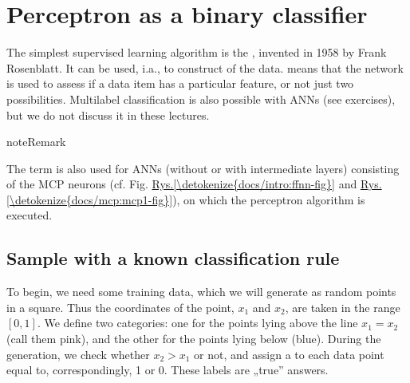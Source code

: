 \documentclass[a4paper,12pt,polish]{jupyterBook}
\begin{document}
\section{Perceptron as a binary classifier}
\label{\detokenize{docs/perceptron:perceptron-as-a-binary-classifier}}
\sphinxAtStartPar
The simplest supervised learning algorithm
is the , invented in 1958 by Frank Rosenblatt. It can be used, i.a., to
construct  of the data.  means that the network
is used to assess if a data item has a particular feature, or not \sphinxhyphen{} just two possibilities. Multi\sphinxhyphen{}label classification is also possible with ANNs (see exercises), but we do not discuss it in these lectures.

\begin{sphinxadmonition}{note}{Remark}

\sphinxAtStartPar
The term  is also used for ANNs (without or with intermediate layers) consisting of the MCP neurons (cf. Fig. \hyperref[\detokenize{docs/intro:ffnn-fig}]{Rys.\@ \ref{\detokenize{docs/intro:ffnn-fig}}} and \hyperref[\detokenize{docs/mcp:mcp1-fig}]{Rys.\@ \ref{\detokenize{docs/mcp:mcp1-fig}}}), on which the perceptron algorithm is executed.
\end{sphinxadmonition}


\subsection{Sample with a known classification rule}
\label{\detokenize{docs/perceptron:sample-with-a-known-classification-rule}}
\sphinxAtStartPar
To begin, we need some training data, which we will generate as random points in a square. Thus the coordinates of the point, \(x_1\) and \(x_2\), are taken in the range \([0,1]\). We define two categories: one for the points lying above the line \(x_1=x_2\) (call them pink), and the other for the points lying below (blue). During the generation, we check whether \(x_2 > x_1\) or not, and assign a  to each data point equal to, correspondingly, 1 or 0. These labels are „true” answers.
\end{document}
